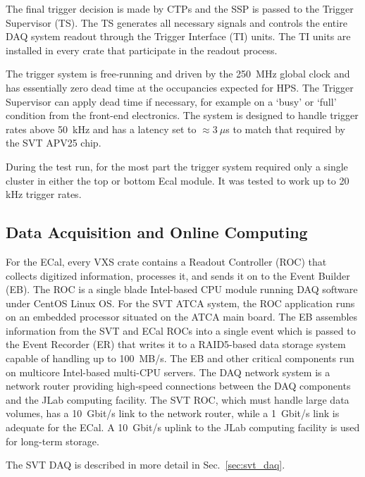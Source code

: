 \documentclass[final,3p,times,twocolumn]{elsarticle}
\begin{document}
The final trigger decision is made by CTPs and the SSP is passed to the Trigger Supervisor (TS). The TS 
generates all necessary signals and controls the entire DAQ system readout through the Trigger 
Interface (TI) units. The TI units are installed in every crate that participate in the readout process. 

The trigger system is free-running and driven by the 250~MHz global clock and has essentially zero 
dead time at the occupancies expected for HPS. The Trigger Supervisor can apply dead time if 
necessary, for example on a `busy' or `full' condition from the front-end electronics. The system is 
designed to handle trigger rates above 50~kHz and has a latency set to $\approx 3~\mu$s to match that 
required by the SVT APV25 chip. 

During the test run, for the most part the trigger system required only a single cluster in either the top or 
bottom Ecal module. It was tested to work up to 20 kHz trigger rates. 

\subsection{Data Acquisition and Online Computing}
\label{sec:daq}
For the ECal, every VXS crate contains a Readout Controller (ROC)
that collects digitized information, processes it, and sends it on to the Event Builder (EB). The ROC is a 
single blade Intel-based CPU module running DAQ software under CentOS Linux OS. For the SVT 
ATCA system, the ROC application runs on an embedded processor situated on the ATCA main board. 
The EB assembles information from the SVT and ECal ROCs into a single event which is passed to the 
Event Recorder (ER) that writes it to a RAID5-based data storage system capable of handling up to 
100~MB/s. The EB and other critical components run on multicore Intel-based multi-CPU servers. The 
DAQ network system is a network router providing high-speed connections between the DAQ 
components and the JLab computing facility. The SVT ROC, which must handle large data volumes, has 
a 10~Gbit/s link to the network router, while a 1~Gbit/s link is adequate for the ECal. A 10~Gbit/s uplink 
to the JLab computing facility is used for long-term storage.

The SVT DAQ is described in more detail in Sec.~\ref{sec:svt_daq}.





\end{document}
